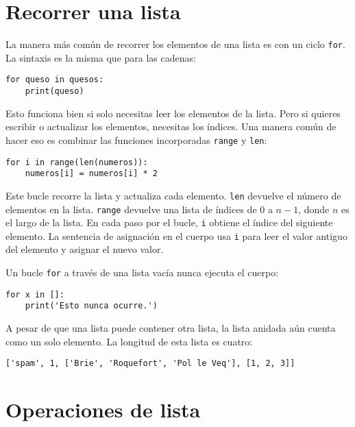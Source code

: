 \documentclass[10pt]{book}
\begin{document}
\section{Recorrer una lista}

La manera más común de recorrer los elementos de una lista es
con un ciclo {\tt for}.  La sintaxis es la misma que para las cadenas:

\begin{verbatim}
for queso in quesos:
    print(queso)
\end{verbatim}
%
Esto funciona bien si solo necesitas leer los elementos de la
lista.  Pero si quieres escribir o actualizar los elementos,
necesitas los índices.  Una manera común de hacer eso es combinar
las funciones incorporadas {\tt range} y {\tt len}:

\begin{verbatim}
for i in range(len(numeros)):
    numeros[i] = numeros[i] * 2
\end{verbatim}
%
Este bucle recorre la lista y actualiza cada elemento.  {\tt len}
devuelve el número de elementos en la lista.  {\tt range} devuelve
una lista de índices de 0 a $n-1$, donde $n$ es el largo de
la lista.  En cada paso por el bucle, {\tt i} obtiene el índice
del siguiente elemento.  La sentencia de asignación en el cuerpo usa
{\tt i} para leer el valor antiguo del elemento y asignar el
nuevo valor.

Un bucle {\tt for} a través de una lista vacía nunca ejecuta el cuerpo:

\begin{verbatim}
for x in []:
    print('Esto nunca ocurre.')
\end{verbatim}
%
A pesar de que una lista puede contener otra lista, la lista
anidada aún cuenta como un solo elemento.  La longitud de esta lista es
cuatro:

\begin{verbatim}
['spam', 1, ['Brie', 'Roquefort', 'Pol le Veq'], [1, 2, 3]]
\end{verbatim}



\section{Operaciones de lista}
\end{document}
